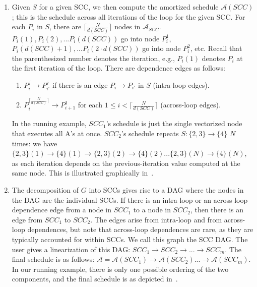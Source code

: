 \begin{enumerate}
\item Given $S$ for a given SCC, we then compute the amortized schedule $\mathcal{A}({\mathit{SCC}})$; 
this is the schedule across all iterations of the loop for the given SCC. For each $P_i$ in $S$, there are $\lceil{\frac{N}{d(SCC)}}\rceil$
nodes in $\mathcal{A}_{\mathit{SCC}}$. $P_i(1),P_i(2),...P_i(d(SCC))$ go into node $P^1_i$, $P_i(d(SCC)+1),...P_i(2\cdot d(SCC))$ 
go into node $P^2_i$, etc. Recall that the parenthesized number denotes the iteration, e.g., $P_i(1)$ denotes $P_i$ at the first iteration 
of the loop. There are dependence edges as follows:
\begin{enumerate}
\item $P^j_i \rightarrow P^j_{i'}$ if there is an edge $P_i \rightarrow P_{i'}$ in $S$ (intra-loop edges).
\item $P^{\lceil{\frac{N}{d(SCC)}}\rceil}_i \rightarrow P^1_{i+1}$ for each $1 \le i < \lceil{\frac{N}{d(SCC)}}\rceil$ (across-loop edges).
\end{enumerate}
In the running example, $SCC_1$'s schedule is just the single vectorized node that executes all A's at once.
$SCC_2$'s schedule repeats $S: \{2,3\} \rightarrow \{4\}$ $N$ times: we have 
$\{2,3\}(1) \rightarrow \{4\}(1) \rightarrow \{2,3\}(2) \rightarrow \{4\}(2) ... \{2,3\}(N) \rightarrow \{4\}(N)$, 
as each iteration depends on the previous-iteration value computed at the same node.
This is illustrated graphically in~.   %

\item The decomposition of $G$ into SCCs gives rise to a DAG where the nodes in the DAG are the individual SCCs. 
If there is an intra-loop or an across-loop dependence edge from a node in $\mathit{SCC}_1$ to a node in $\mathit{SCC}_2$, 
then there is an edge from $\mathit{SCC}_1$ to $\mathit{SCC}_2$. The edges arise from intra-loop and from across-loop dependences, 
but note that across-loop dependences are rare, as they are typically accounted for within SCCs. We call this graph the SCC DAG.
The user gives a linearization of this DAG: $SCC_1 \rightarrow SCC_2 \rightarrow ... \rightarrow SCC_m$. 
The final schedule is as follows: $\mathcal{A} = \mathcal{A}({\mathit{SCC}_1}) \rightarrow \mathcal{A}({\mathit{SCC}_2}) ... \rightarrow \mathcal{A}({\mathit{SCC}_m})$.
In our running example, there is only one possible ordering of the two components, 
and the final schedule is as depicted in~. %


\end{enumerate}

